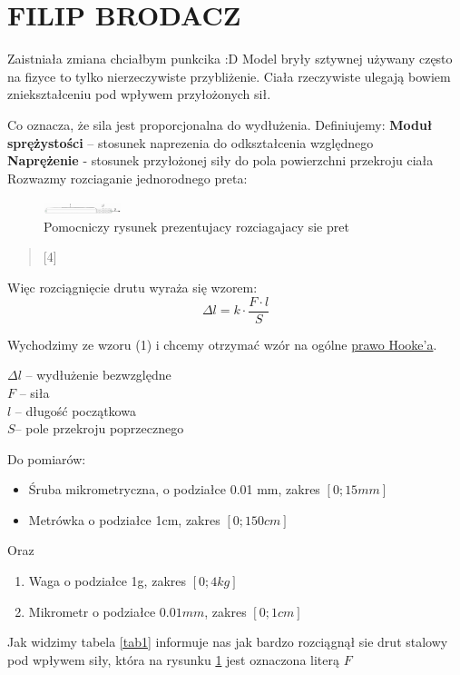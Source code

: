 
\section{FILIP BRODACZ}

Zaistniała zmiana chciałbym punkcika :D
Model bryły sztywnej używany często na fizyce to tylko nierzeczywiste przybliżenie. Ciała rzeczywiste ulegają bowiem zniekształceniu pod wpływem przyłożonych sił.

	
Co oznacza, że sila jest proporcjonalna do wydłużenia. Definiujemy:
	\textbf{Moduł sprężystości} – stosunek naprezenia  do odkształcenia względnego\\
	\textbf{Naprężenie} - stosunek przyłożonej siły do pola powierzchni przekroju ciała\\


Rozwazmy rozciaganie jednorodnego preta:
\begin{figure}[htbp]
    \centering
    \includegraphics[width=0.2\textwidth]{pictures/pret.jpg}
    \caption{Pomocniczy rysunek prezentujacy rozciagajacy sie pret}
    \label{rys1}
\end{figure}

\begin{quote}
     [4] 
\end{quote}
Więc rozciągnięcie drutu wyraża się wzorem: 
\begin{equation}\label{eq1}
 \Delta l = k \cdot \frac{F \cdot l}{S}
\end{equation}

Wychodzimy ze wzoru (1) i chcemy otrzymać wzór na ogólne \underline{prawo Hooke’a}.
\begin{center}
$ \Delta l $ – wydłużenie bezwzględne \\
$F$ – siła \\
$l$ – długość początkowa\\
$S$– pole przekroju poprzecznego\\
\end{center}

\newpage
Do pomiarów:

\begin{itemize}
    \item Śruba mikrometryczna, o podziałce 0.01 mm, zakres $\left[0;15mm\right]$
    \item Metrówka o podziałce 1cm, zakres $\left[0;150cm\right]$
\end{itemize}

Oraz

\begin{enumerate}
    \item Waga o podziałce 1g, zakres $\left[0;4kg\right]$
    \item Mikrometr o podziałce $0.01mm$, zakres $\left[0;1cm\right]$
\end{enumerate}



Jak widzimy tabela \ref{tab1} informuje nas jak bardzo rozciągnął sie drut stalowy pod wpływem siły, która na rysunku \ref{rys1} jest oznaczona literą $F$

